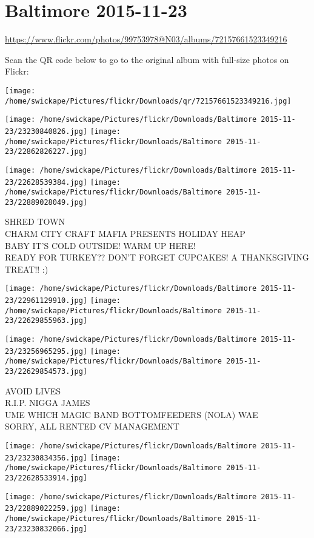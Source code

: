 \documentclass[10pt,letterpaper]{article}
\title{}
\author{}
\date{}
\begin{document}
\section*{Baltimore 2015-11-23}

\url{https://www.flickr.com/photos/99753978@N03/albums/72157661523349216}

Scan the QR code below to go to the original album with full-size photos on Flickr:

\texttt{[image: /home/swickape/Pictures/flickr/Downloads/qr/72157661523349216.jpg]}
\pagebreak

\texttt{[image: /home/swickape/Pictures/flickr/Downloads/Baltimore 2015-11-23/23230840826.jpg]}
\texttt{[image: /home/swickape/Pictures/flickr/Downloads/Baltimore 2015-11-23/22862826227.jpg]}

\texttt{[image: /home/swickape/Pictures/flickr/Downloads/Baltimore 2015-11-23/22628539384.jpg]}
\texttt{[image: /home/swickape/Pictures/flickr/Downloads/Baltimore 2015-11-23/22889028049.jpg]}

SHRED TOWN\\
CHARM CITY CRAFT MAFIA PRESENTS HOLIDAY HEAP\\
BABY IT'S COLD OUTSIDE!  WARM UP HERE!\\
READY FOR TURKEY??  DON'T FORGET CUPCAKES!  A THANKSGIVING TREAT!! :)
\pagebreak

\texttt{[image: /home/swickape/Pictures/flickr/Downloads/Baltimore 2015-11-23/22961129910.jpg]}
\texttt{[image: /home/swickape/Pictures/flickr/Downloads/Baltimore 2015-11-23/22629855963.jpg]}

\texttt{[image: /home/swickape/Pictures/flickr/Downloads/Baltimore 2015-11-23/23256965295.jpg]}
\texttt{[image: /home/swickape/Pictures/flickr/Downloads/Baltimore 2015-11-23/22629854573.jpg]}

AVOID LIVES\\
R.I.P. NIGGA JAMES\\
UME WHICH MAGIC BAND BOTTOMFEEDERS (NOLA) WAE\\
SORRY, ALL RENTED CV MANAGEMENT
\pagebreak

\texttt{[image: /home/swickape/Pictures/flickr/Downloads/Baltimore 2015-11-23/23230834356.jpg]}
\texttt{[image: /home/swickape/Pictures/flickr/Downloads/Baltimore 2015-11-23/22628533914.jpg]}

\texttt{[image: /home/swickape/Pictures/flickr/Downloads/Baltimore 2015-11-23/22889022259.jpg]}
\texttt{[image: /home/swickape/Pictures/flickr/Downloads/Baltimore 2015-11-23/23230832066.jpg]}
\end{document}
